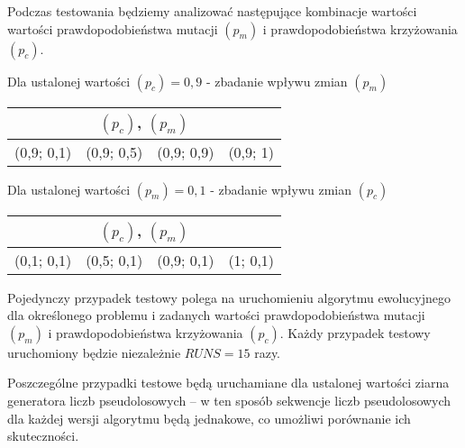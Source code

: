 \documentclass[12pt, a4paper]{article}
\begin{document}
Podczas testowania będziemy analizować następujące kombinacje wartości wartości prawdopodobieństwa mutacji $(p_m)$ i prawdopodobieństwa krzyżowania $(p_c)$.

\bigskip

Dla ustalonej wartości $(p_c) = 0,9$ - zbadanie wpływu zmian $(p_m)$
\begin{center}
\begin{tabular}{|l|l|l|l|}
\hline
\multicolumn{4}{|c|}{$(p_c)$, $(p_m)$} \\
\hline
(0,9; 0,1) & (0,9; 0,5) & (0,9; 0,9) & (0,9; 1)\\
\hline
\end{tabular}
\end{center}

\bigskip

Dla ustalonej wartości $(p_m) = 0,1$ - zbadanie wpływu zmian $(p_c)$
\begin{center}
\begin{tabular}{|l|l|l|l|}
\hline
\multicolumn{4}{|c|}{$(p_c)$, $(p_m)$} \\
\hline
(0,1; 0,1) & (0,5; 0,1) & (0,9; 0,1) & (1; 0,1)\\
\hline
\end{tabular}
\end{center}

\bigskip
Pojedynczy przypadek testowy polega na uruchomieniu algorytmu ewolucyjnego dla określonego problemu i zadanych wartości prawdopodobieństwa mutacji $(p_m)$ i prawdopodobieństwa krzyżowania $(p_c)$. Każdy przypadek testowy uruchomiony będzie niezależnie $RUNS = 15$ razy.

Poszczególne przypadki testowe będą uruchamiane dla ustalonej wartości ziarna generatora liczb pseudolosowych -- w ten sposób sekwencje liczb pseudolosowych dla każdej wersji algorytmu będą jednakowe, co umożliwi porównanie ich skuteczności.
 
\nocite{*}


\end{document}
